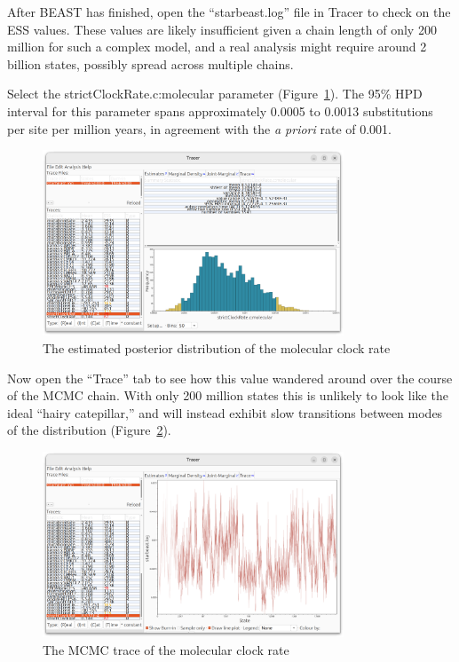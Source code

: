 \documentclass[12pt]{article}
\begin{document}
After BEAST has finished, open the ``starbeast.log'' file in Tracer to check
on the ESS values. These values are likely insufficient given a chain length
of only 200 million for such a complex model, and a real analysis might require
around 2 billion states, possibly spread across multiple chains.

Select the strictClockRate.c:molecular parameter
(Figure~\ref{fig:clockRateHistogram}). The 95\% HPD interval for this parameter
spans approximately 0.0005 to 0.0013 substitutions per site per million years,
in agreement with the \textit{a priori} rate of 0.001.

\begin{figure}[htb!]
\centering
\includegraphics[width=0.8\textwidth]{figures/clockRateHistogram.png}
\caption
{The estimated posterior distribution of the molecular clock rate}
\label{fig:clockRateHistogram}
\end{figure}

Now open the ``Trace'' tab to see how this value wandered around over the
course of the MCMC chain. With only 200 million states this is unlikely
to look like the ideal ``hairy catepillar,'' and will instead exhibit slow
transitions between modes of the distribution (Figure~\ref{fig:clockRateTrace}).

\begin{figure}[htb!]
\centering
\includegraphics[width=0.8\textwidth]{figures/clockRateTrace.png}
\caption
{The MCMC trace of the molecular clock rate}
\label{fig:clockRateTrace}
\end{figure}
\end{document}

